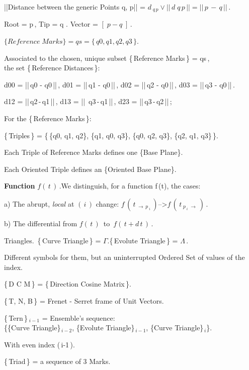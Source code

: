 \documentclass[12pt]{article} %
\begin{document}
\noindent ||\;Distance between the generic Points q, p\;|| = $d_{\;q\,p} \vee ||\,d\;q\,p\,|| = ||\,p\,-\,q\,||$\,.

\noindent Root = p\,, Tip = q . Vector = $[\;p -q\;]$\,.

\noindent $ \{Reference\;Marks\} = qs = \{\,q0, q1, q2, q3\,\}$.

\noindent Associated to the chosen, unique subset \{\,Reference Marks\,\} = qs\,,\\ the set \{\,Reference Distances\,\}: 

\noindent d00 = ||\,q0 - q0\,||\,, d01 = ||\,q1 - q0\,||\,, d02 = ||\,q2 - q0\,||\,, d03 = ||\,q3 - q0\,||\,.

\noindent d12 = ||\,q2\,-\,q1\,||\,, d13 = ||\, q3\,-\,q1\,||\,, d23 = ||\,q3\,-\,q2\,||\,; 

\noindent For the \{\,Reference Marks\,\}:

\noindent \{\,Triples\,\} = \big\{\,\{q0, q1, q2\}, \{q1, q0, q3\}, \{q0, q2, q3\}, \{q2, q1, q3\}\,\big\}. 

\noindent Each Triple of Reference Marks defines one \{Base Plane\}.

\noindent Each Oriented Triple defines an \{Oriented Base Plane\}.

\noindent \textbf{Function} $f(\,t\,)$\,.\quad We distinguish, for a function f\,(t), the cases:
  
\noindent a) The abrupt, \textsl{local} at $(\,i\,)$ change:\; $f\,(\,t_{\;\to\,p_{\;i}}\,)$\;\;-->\;\;$f\,(\,t_{\;p_{\;i}\;\to}\,)$\,.

\noindent b) The differential from $f(\,t\,)$ \,to \,$f(\,t + d\,t\,)$\,. 

\noindent Triangles.\, \{\,Curve Triangle\,\} = $\Gamma$\;.\;\{\,Evolute Triangle\,\} = $\Lambda$\,.
 
\noindent Different symbols for them, but an uninterrupted Ordered Set of values of the index.

\noindent \{\,D C M\,\} = \{\,Direction Cosine Matrix\,\}.

\noindent \{\,T, N, B\,\} = Frenet - Serret frame of Unit Vectors.

\noindent \{\,Tern\,\}$_{\;i-1}$ = Ensemble's sequence:\\ \big\{\;\{Curve Triangle\}$_{\,i-2}$, \{Evolute Triangle\}$_{\,i-1}$, \{Curve Triangle\}$_{\,i}$\;\big\}.

\noindent With even index (\,i-1\,).
 
\noindent \{\,Triad\,\} = a sequence of 3 Marks.
\end{document}
